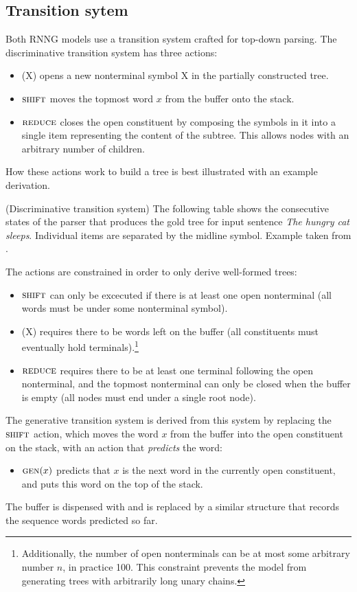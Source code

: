   \subsection{Transition sytem}
    Both RNNG models use a transition system crafted for top-down parsing. The discriminative transition system has three actions:
    \begin{itemize}
      \item \open(X) opens a new nonterminal symbol X in the partially constructed tree.
      \item $\textsc{shift}$ moves the topmost word $x$ from the buffer onto the stack.
      \item $\textsc{reduce}$ closes the open constituent by composing the symbols in it into a single item representing the content of the subtree. This allows nodes with an arbitrary number of children.
    \end{itemize}
    How these actions work to build a tree is best illustrated with an example derivation.

    \begin{example}{(Discriminative transition system)}
      \label{ex:disc-states}
      The following table shows the consecutive states of the parser that produces the gold tree for input sentence \textit{The hungry cat sleeps}. Individual items are separated by the midline symbol. Example taken from \citet{dyer2016rnng}.
      
    \end{example}

     The actions are constrained in order to only derive well-formed trees:
    \begin{itemize}
      \item $\textsc{shift}$ can only be excecuted if there is at least one open nonterminal (all words must be under some nonterminal symbol).
      \item \open(X) requires there to be words left on the buffer (all constituents must eventually hold terminals).\footnote{Additionally, the number of open nonterminals can be at most some arbitrary number $n$, in practice 100. This constraint prevents the model from generating trees with arbitrarily long unary chains.}
      \item $\textsc{reduce}$ requires there to be at least one terminal following the open nonterminal, and the topmost nonterminal can only be closed when the buffer is empty (all nodes must end under a single root node).
    \end{itemize}
    The generative transition system is derived from this system by replacing the $\textsc{shift}$ action, which moves the word $x$ from the buffer into the open constituent on the stack, with an action that \textit{predicts} the word:
    \begin{itemize}
      \item $\textsc{gen}(x)$ predicts that $x$ is the next word in the currently open constituent, and puts this word on the top of the stack.
    \end{itemize}
    The buffer is dispensed with and is replaced by a similar structure that records the sequence words predicted so far.

